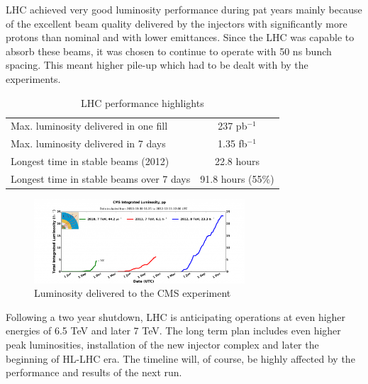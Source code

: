 LHC achieved very good luminosity performance during pat years mainly because of the excellent beam quality delivered by the injectors with significantly more protons than nominal and with lower emittances. Since the LHC was capable to absorb these beams, it was chosen to continue to operate with 50 ns bunch spacing. This meant higher pile-up which had to be dealt with by the experiments. 


\begin{table}[h]
\centering
  \caption{LHC performance highlights}
  \begin{tabular}{ l  c }
      \hline
      \hline
      Max. luminosity delivered in one fill & 237 pb$^{-1}$  \\
      Max. luminosity delivered in 7 days & 1.35 fb$^{-1}$  \\
      Longest time in stable beams (2012) & 22.8 hours \\
      Longest time in stable beams over 7 days & 91.8 hours (55$\%$) \\
      \hline
      \hline 
  \end{tabular}
\end{table}

\begin{figure}[htbp]
	\centering
		\includegraphics[width=0.7\textwidth]{Figures/lumi.png}
	\caption[Luminosity delivered to the CMS experiment]{Luminosity delivered to the CMS experiment}
	\label{fig:LHC_lumi}
\end{figure}
 
Following a two year shutdown, LHC is anticipating operations at even higher energies of 6.5 TeV and later 7 TeV. The long term plan includes even higher peak luminosities, installation of the new injector complex and later the beginning of HL-LHC era. The timeline will, of course, be highly affected by the performance and results of the next run.